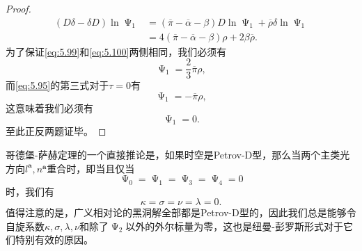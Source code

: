 \begin{proof}
\begin{equation}
		\begin{aligned}
			(D\delta -\delta D)\ln \upPsi _{1} & =(\overline{\pi } -\overline{\alpha } -\beta )D\ln \upPsi _{1} +\overline{\rho } \delta \ln \upPsi _{1}\\
			& =4(\overline{\pi } -\overline{\alpha } -\beta )\rho +2\beta \overline{\rho } .
		\end{aligned}
	\end{equation}
	为了保证\ref{eq:5.99}和\ref{eq:5.100}两侧相同，我们必须有
	\begin{equation*}
		\upPsi _{1} =\frac{2}{3}\overline{\pi } \rho ,
	\end{equation*}
	而\ref{eq:5.95}的第三式对于$\tau =0$有
	\begin{equation*}
		\upPsi _{1} =-\overline{\pi } \rho ,
	\end{equation*}
	这意味着我们必须有
	\begin{equation*}
		\upPsi _{1} =0.
	\end{equation*}
	至此正反两题证毕。
\end{proof}

哥德堡-萨赫定理的一个直接推论是，如果时空是Petrov-D型，那么当两个主类光方向$l^{\boldsymbol{a}} ,n^{\boldsymbol{a}}$重合时，即当且仅当
\begin{equation*}
	\upPsi _{0} =\upPsi _{1} =\upPsi _{3} =\upPsi _{4} =0
\end{equation*}
时，我们有
\begin{equation*}
	\kappa =\sigma =\nu =\lambda =0.
\end{equation*}
值得注意的是，广义相对论的黑洞解全部都是Petrov-D型的，因此我们总是能够令自旋系数$\kappa ,\sigma ,\lambda ,\nu $和除了$\upPsi _{2}$以外的外尔标量为零，这也是纽曼-彭罗斯形式对于它们特别有效的原因。